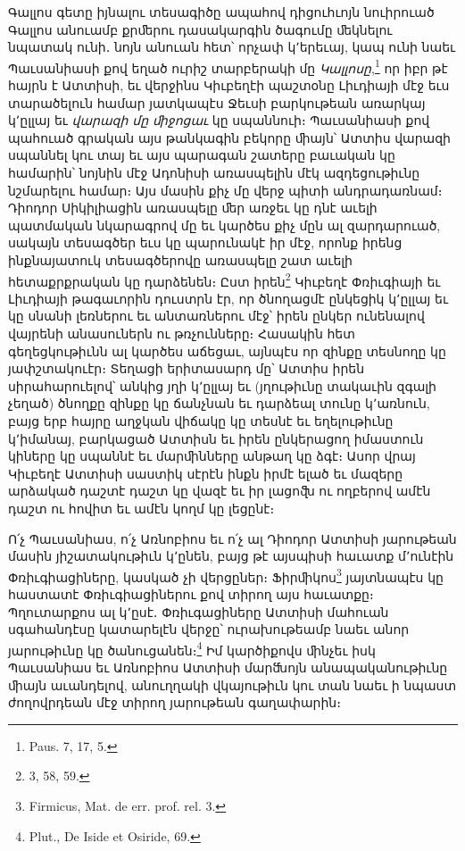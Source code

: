 \documentclass{article}
\begin{document}
{Գալլոս գետը իյնալու տեսագիծը ապահով դիցուհւոյն նուիրուած Գալլոս անուամբ քրﬔրու դասակարգին ծագումը ﬔկնելու նպատակ ունի․ նոյն անուան հետ՝ որչափ կ՚երեւայ, կապ ունի նաեւ Պաւսանիասի քով եղած ուրիշ տարբերակի մը \emph{Կալլոսը},\footnote{Paus. 7, 17, 5.} որ իբր թէ հայրն է Ատտիսի, եւ վերջինս Կիւբեղէի պաշտօնը Լիւդիայի մէջ եւս տարածելուն համար յատկապէս Ջեւսի բարկութեան առարկայ կ՚ըլլայ եւ \emph{վարազի մը ﬕջոցաւ} կը սպաննուի։ Պաւսանիասի քով պահուած գրական այս թանկագին բեկորը ﬕայն՝ Ատտիս վարազի սպաննել կու տայ եւ այս պարագան շատերը բաւական կը համարին՝ նոյնին մէջ Ադոնիսի առասպելին մէկ ազդեցութիւնը նշմարելու համար։ Այս մասին քիչ մը վերջ պիտի անդրադառնամ։ Դիոդոր Սիկիլիացին առասպելը ﬔր առջեւ կը դնէ աւելի պատմական նկարագրով մը եւ կարծես քիչ մըն ալ զարդարուած, սակայն տեսագծեր եւս կը պարունակէ իր մէջ, որոնք իրենց ինքնայատուկ տեսագծերովը առասպելը շատ աւելի հետաքրքրական կը դարձենեն։ Ըստ իրեն\footnote{3, 58, 59.} Կիւբեղէ Փռիւգիայի եւ Լիւդիայի թագաւորին դուստրն էր, որ ծնողացմէ ընկեցիկ կ՚ըլլայ եւ կը սնանի լեռներու եւ անտառներու մէջ՝ իրեն ընկեր ունենալով վայրենի անասուներն ու թռչունները։ Հասակին հետ գեղեցկութիւնն ալ կարծես աճեցաւ, այնպէս որ զինքը տեսնողը կը յափշտակուէր։ Տեղացի երիտասարդ մը՝ Ատտիս իրեն սիրահարուելով՝ անկից յղի կ՚ըլլայ եւ (յղութիւնը տակաւին զգալի չեղած) ծնողքը զինքը կը ճանչնան եւ դարձեալ տունը կ՚առնուն, բայց երբ հայրը աղջկան վիճակը կը տեսնէ եւ եղելութիւնը կ՚իմանայ, բարկացած Ատտիսն եւ իրեն ընկերացող իմաստուն կիները կը սպաննէ եւ մարﬕնները անթաղ կը ձգէ։ Ասոր վրայ Կիւբեղէ Ատտիսի սաստիկ սէրէն ինքն իրմէ ելած եւ մազերը արձակած դաշտէ դաշտ կը վազէ եւ իր լացոﬖ ու ողբերով ամէն դաշտ ու հովիտ եւ ամէն կողմ կը լեցընէ։

Ո՛չ Պաւսանիաս, ո՛չ Առնոբիոս եւ ո՛չ ալ Դիոդոր Ատտիսի յարութեան մասին յիշատակութիւն կ՚ընեն, բայց թէ այսպիսի հաւատք մ՚ունէին Փռիւգիացիները, կասկած չի վերցըներ։ Ֆիրﬕկոս\footnote{Firmicus, Mat. de err. prof. rel. 3.} յայտնապէս կը հաստատէ Փռիւգիացիներու քով տիրող այս հաւատքը։ Պղուտարքոս ալ կ՚ըսէ․ Փռիւգացիները Ատտիսի մահուան սգահանդէսը կատարելէն վերջը՝ ուրախութեամբ նաեւ անոր յարութիւնը կը ծանուցանեն։\footnote{Plut., De Iside et Osiride, 69.} Իմ կարծիքովս ﬕնչեւ իսկ Պաւսանիաս եւ Առնոբիոս Ատտիսի մարﬓոյն անապականութիւնը ﬕայն աւանդելով, անուղղակի վկայութիւն կու տան նաեւ ի նպաստ ժողովրդեան մէջ տիրող յարութեան գաղափարին։

}
\end{document}
